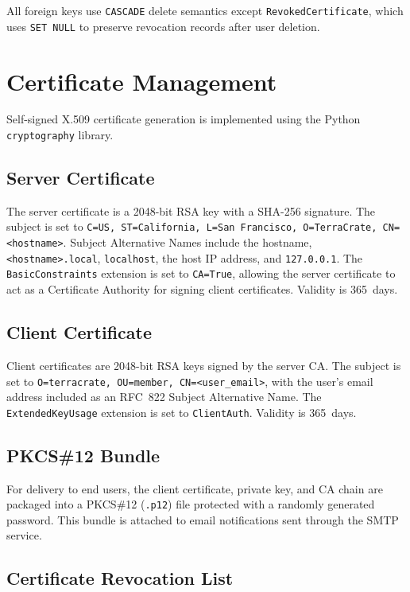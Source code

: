 \documentclass[12pt,letterpaper]{report}
\begin{document}
All foreign keys use \texttt{CASCADE} delete semantics except \texttt{RevokedCertificate}, which uses \texttt{SET NULL} to preserve revocation records after user deletion.

\section{Certificate Management}

Self-signed X.509 certificate generation is implemented using the Python \texttt{cryptography} library.

\subsection{Server Certificate}

The server certificate is a 2048-bit RSA key with a SHA-256 signature. The subject is set to \texttt{C=US, ST=California, L=San Francisco, O=TerraCrate, CN=<hostname>}. Subject Alternative Names include the hostname, \texttt{<hostname>.local}, \texttt{localhost}, the host IP address, and \texttt{127.0.0.1}. The \texttt{BasicConstraints} extension is set to \texttt{CA=True}, allowing the server certificate to act as a Certificate Authority for signing client certificates. Validity is 365~days.

\subsection{Client Certificate}

Client certificates are 2048-bit RSA keys signed by the server CA. The subject is set to \texttt{O=terracrate, OU=member, CN=<user\_email>}, with the user's email address included as an RFC~822 Subject Alternative Name. The \texttt{ExtendedKeyUsage} extension is set to \texttt{ClientAuth}. Validity is 365~days.

\subsection{PKCS\#12 Bundle}

For delivery to end users, the client certificate, private key, and CA chain are packaged into a PKCS\#12 (\texttt{.p12}) file protected with a randomly generated password. This bundle is attached to email notifications sent through the SMTP service.

\subsection{Certificate Revocation List}
\end{document}
